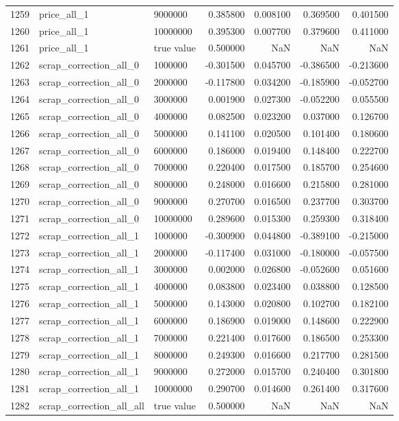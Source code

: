 \begin{tabular}{lllrrrr}
1259 & price_all_1 & 9000000 & 0.385800 & 0.008100 & 0.369500 & 0.401500 \\
1260 & price_all_1 & 10000000 & 0.395300 & 0.007700 & 0.379600 & 0.411000 \\
1261 & price_all_1 & true value & 0.500000 & NaN & NaN & NaN \\
1262 & scrap_correction_all_0 & 1000000 & -0.301500 & 0.045700 & -0.386500 & -0.213600 \\
1263 & scrap_correction_all_0 & 2000000 & -0.117800 & 0.034200 & -0.185900 & -0.052700 \\
1264 & scrap_correction_all_0 & 3000000 & 0.001900 & 0.027300 & -0.052200 & 0.055500 \\
1265 & scrap_correction_all_0 & 4000000 & 0.082500 & 0.023200 & 0.037000 & 0.126700 \\
1266 & scrap_correction_all_0 & 5000000 & 0.141100 & 0.020500 & 0.101400 & 0.180600 \\
1267 & scrap_correction_all_0 & 6000000 & 0.186000 & 0.019400 & 0.148400 & 0.222700 \\
1268 & scrap_correction_all_0 & 7000000 & 0.220400 & 0.017500 & 0.185700 & 0.254600 \\
1269 & scrap_correction_all_0 & 8000000 & 0.248000 & 0.016600 & 0.215800 & 0.281000 \\
1270 & scrap_correction_all_0 & 9000000 & 0.270700 & 0.016500 & 0.237700 & 0.303700 \\
1271 & scrap_correction_all_0 & 10000000 & 0.289600 & 0.015300 & 0.259300 & 0.318400 \\
1272 & scrap_correction_all_1 & 1000000 & -0.300900 & 0.044800 & -0.389100 & -0.215000 \\
1273 & scrap_correction_all_1 & 2000000 & -0.117400 & 0.031000 & -0.180000 & -0.057500 \\
1274 & scrap_correction_all_1 & 3000000 & 0.002000 & 0.026800 & -0.052600 & 0.051600 \\
1275 & scrap_correction_all_1 & 4000000 & 0.083800 & 0.023400 & 0.038800 & 0.128500 \\
1276 & scrap_correction_all_1 & 5000000 & 0.143000 & 0.020800 & 0.102700 & 0.182100 \\
1277 & scrap_correction_all_1 & 6000000 & 0.186900 & 0.019000 & 0.148600 & 0.222900 \\
1278 & scrap_correction_all_1 & 7000000 & 0.221400 & 0.017600 & 0.186500 & 0.253300 \\
1279 & scrap_correction_all_1 & 8000000 & 0.249300 & 0.016600 & 0.217700 & 0.281500 \\
1280 & scrap_correction_all_1 & 9000000 & 0.272000 & 0.015700 & 0.240400 & 0.301800 \\
1281 & scrap_correction_all_1 & 10000000 & 0.290700 & 0.014600 & 0.261400 & 0.317600 \\
1282 & scrap_correction_all_all & true value & 0.500000 & NaN & NaN & NaN \\
\bottomrule
\end{tabular}
